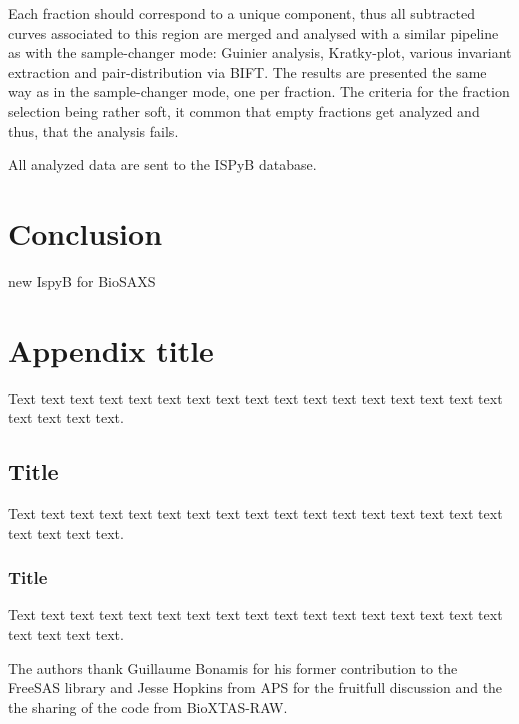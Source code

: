 \documentclass[preprint]{iucr}              %
\begin{document}
Each fraction should correspond to a unique component, thus all subtracted curves associated to this region are merged and analysed
with a similar pipeline as with the sample-changer mode: Guinier analysis, Kratky-plot, various invariant extraction and 
pair-distribution via BIFT. 
The results are presented the same way as in the sample-changer mode, one per fraction.
The criteria for the fraction selection being rather soft, it common that empty fractions get analyzed and thus, 
that the analysis fails. 

All analyzed data are sent to the ISPyB database.     

\section{Conclusion}

new IspyB for BioSAXS


\appendix
\section{Appendix title}

Text text text text text text text text text text text text text text
text text text text text text text.

\subsection{Title}

Text text text text text text text text text text text text text text
text text text text text text text.

\subsubsection{Title}

Text text text text text text text text text text text text text text
text text text text text text text.




The authors thank Guillaume Bonamis for his former contribution to the FreeSAS library and Jesse Hopkins from APS for the fruitfull 
discussion and the the sharing of the code from BioXTAS-RAW.
\end{document}
